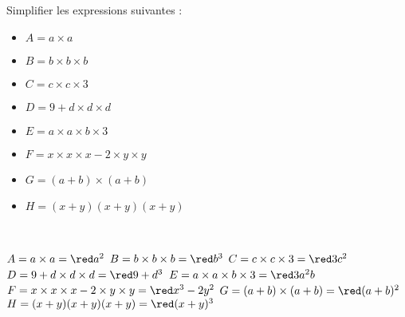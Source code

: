 \begin{exercice*}
   Simplifier les expressions suivantes :
   \begin{itemize}
      \item[] $A =a\times a$
      \item[] $B =b\times b\times b$
      \item[] $C =c\times c\times3$
      \item[] $D =9+d\times d\times d$
      \item[] $E =a\times a\times b\times3$
      \item[] $F =x\times x\times x-2\times y\times y$
      \item[] $G =(a+b)\times(a+b)$
      \item[] $H =(x+y)(x+y)(x+y)$
   \end{itemize}
\end{exercice*}

\begin{corrige}
   \ \\ [-5mm]
   \begin{itemize}
   \def\item{}
   \item $A =a\times a =\red a^2$
   \item $B =b\times b\times b =\red b^3$
   \item $C =c\times c\times3 =\red3c^2$
   \item $D =9+d\times d\times d =\red9+d^3$
   \item $E =a\times a\times b\times3 =\red3a^2b$
   \item $F =x\times x\times x-2\times y\times y =\red x^3-2y^2$
   \item $G =(a+b)\times(a+b) =\red(a+b)^2$
   \item $H =(x+y)(x+y)(x+y) =\red(x+y)^3$ \medskip
\end{itemize}
\end{corrige}